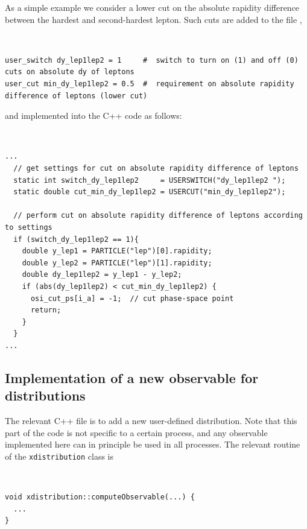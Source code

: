 \documentclass[english,11pt]{article}
\begin{document}
As a simple example we consider a lower cut on the absolute rapidity difference between the hardest and second-hardest lepton. 
Such cuts are added to the file ,

{\tt
\begin{lstlisting}[style=InputStyle]
user_switch dy_lep1lep2 = 1     #  switch to turn on (1) and off (0) cuts on absolute dy of leptons
user_cut min_dy_lep1lep2 = 0.5  #  requirement on absolute rapidity difference of leptons (lower cut)
\end{lstlisting}
}

and implemented into the C++ code as follows:

{\tt
\begin{lstlisting}
...
  // get settings for cut on absolute rapidity difference of leptons
  static int switch_dy_lep1lep2     = USERSWITCH("dy_lep1lep2 ");
  static double cut_min_dy_lep1lep2 = USERCUT("min_dy_lep1lep2");
    
  // perform cut on absolute rapidity difference of leptons according to settings
  if (switch_dy_lep1lep2 == 1){
    double y_lep1 = PARTICLE("lep")[0].rapidity;
    double y_lep2 = PARTICLE("lep")[1].rapidity;
    double dy_lep1lep2 = y_lep1 - y_lep2;
    if (abs(dy_lep1lep2) < cut_min_dy_lep1lep2) {
      osi_cut_ps[i_a] = -1;  // cut phase-space point
      return;
    }
  }
...
\end{lstlisting}
}

\subsection{Implementation of a new observable for distributions}

The relevant C++ file is  to add a new user-defined distribution. 
Note that this part of the code is not specific to a certain process, and any observable implemented here can in principle be used in all processes.
The relevant routine of the {\tt xdistribution} class is
{\tt
\begin{lstlisting}
void xdistribution::computeObservable(...) {
  ...
}
\end{lstlisting}
}
\end{document}
